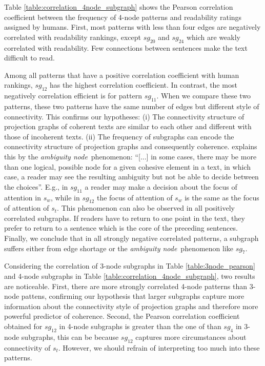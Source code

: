 Table \ref{table:correlation_4node_subgraph} shows the Pearson correlation coefficient between the frequency of 4-node patterns and readability ratings assigned by humans.  
First, most patterns with less than four edges are negatively correlated with readability rankings, except $sg_{20}$ and $sg_{24}$ which are weakly correlated with readability. 
Few connections between sentences make the text difficult to read.

Among all patterns that have a positive correlation coefficient with human rankings, 
$sg_{12}$ has the highest correlation coefficient.  
In contrast, the most negatively correlation efficient is for pattern $sg_{11}$. 
When we compare these two patterns, these two patterns have the same number of edges but  different style of connectivity.
This confirms our hypotheses: (i) The connectivity structure of projection graphs of coherent texts are similar to each other and different with those of incoherent texts. 
(ii) The frequency of subgraphs can encode the connectivity structure of projection graphs and consequently coherence. 
 explains this by the \emph{ambiguity node}\ phenomenon: ``[...] in some cases, there may be more
than one logical, possible node for a given cohesive element in a text, in which case, a reader may see the resulting ambiguity but not be able to decide between the choices''. 
E.g., in $sg_{11}$ a reader may make a decision about the focus of attention in $s_w$, while in $sg_{12}$ the focus of attention of $s_w$ is the same as the
focus of attention of $s_t$. 
This phenomenon can also be observed in all positively correlated subgraphs. 
If readers have to return to one point in the text, they prefer to return to a sentence which is the core of the preceding sentences.
Finally, we conclude that in all strongly negative correlated patterns, a subgraph suffers either from edge shortage or the \textit{ambiguity node}\ phenomenon like $sg_7$.


Considering the correlation of 3-node subgraphs in Table \ref{table:3node_pearson} and 4-node subgraphs in Table \ref{table:correlation_4node_subgraph}, two results are noticeable.
First, there are more strongly correlated 4-node patterns than 3-node pattens, confirming our hypothesis that larger subgraphs capture more information about the connectivity style of projection graphs and therefore more powerful predictor of coherence.  
Second, the Pearson correlation coefficient obtained for $sg_{12}$ in 4-node subgraphs is greater than the one of than $sg_4$ in 3-node subgraphs, this can be because $sg_{12}$ captures more circumstances about connectivity of $s_t$. 
However, we should refrain of interpreting too much into these patterns.



